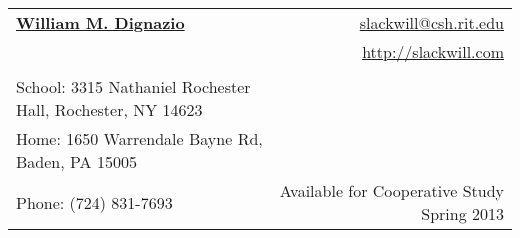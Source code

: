 \documentclass[letterpaper,11pt]{article}
\begin{document}
 

\thispagestyle{empty}
\pagestyle{empty}

\newcommand{\mywebheader}{
\begin{tabular*}{7in}{l@{\extracolsep{\fill}}r} \\
	\textbf{\href{http://www.slackwill.com/}{\large William M. Dignazio}} & \href{mailto:slackwill@csh.rit.edu}{slackwill@csh.rit.edu}\\ &
	\href{http://slackwill.com/}{http://slackwill.com} \\ \vspace{-10mm} \\
	{\footnotesize {{School: 3315 Nathaniel Rochester Hall,
Rochester, NY 14623}}} & \\
	{\footnotesize {{Home: 1650 Warrendale Bayne Rd, Baden, PA 15005}}} & \\
	{\footnotesize {{Phone: (724) 831-7693}}} & Available for Cooperative Study Spring 2013
	\end{tabular*}
\\
\vspace{0.1in}}

\mywebheader
\end{document}
